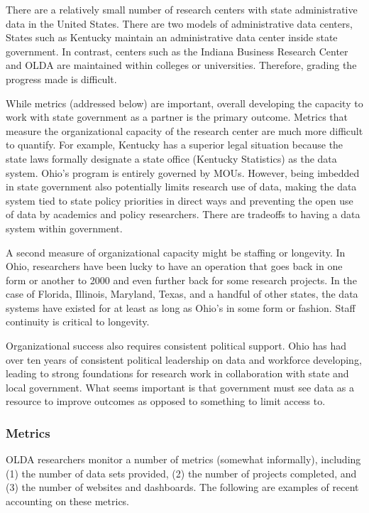 There are a relatively small number of research centers with state administrative data in the United States. There are two models of administrative data centers, States such as Kentucky maintain an administrative data center inside state government. In contrast, centers such as the Indiana Business Research Center and OLDA are maintained within colleges or universities. Therefore, grading the progress made is difficult.

While metrics (addressed below) are important, overall developing the capacity to work with state government as a partner is the primary outcome. Metrics that measure the organizational capacity of the research center are much more difficult to quantify. For example, Kentucky has a superior legal situation because the state laws formally designate a state office (Kentucky Statistics) as the data system. Ohio's program is entirely governed by MOUs. However, being imbedded in state government also potentially limits research use of data, making the data system tied to state policy priorities in direct ways and preventing the open use of data by academics and policy researchers. There are tradeoffs to having a data system within government.

A second measure of organizational capacity might be staffing or longevity. In Ohio, researchers have been lucky to have an operation that goes back in one form or another to 2000 and even further back for some research projects. In the case of Florida, Illinois, Maryland, Texas, and a handful of other states, the data systems have existed for at least as long as Ohio's in some form or fashion. Staff continuity is critical to longevity.

Organizational success also requires consistent political support. Ohio has had over ten years of consistent political leadership on data and workforce developing, leading to strong foundations for research work in collaboration with state and local government. What seems important is that government must see data as a resource to improve outcomes as opposed to something to limit access to.

\hypertarget{metrics-1}{%
\subsubsection*{Metrics}\label{metrics-1}}

OLDA researchers monitor a number of metrics (somewhat informally), including (1) the number of data sets provided, (2) the number of projects completed, and (3) the number of websites and dashboards. The following are examples of recent accounting on these metrics.


